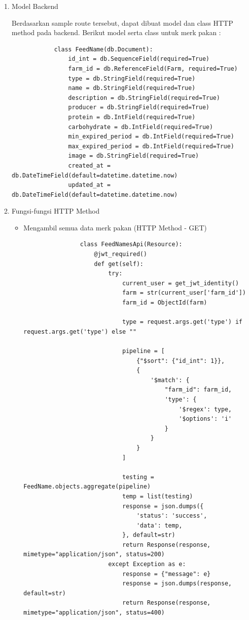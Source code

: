 \begin{spacing}{1.5}
\begin{enumerate}
\begin{enumerate}
		\end{enumerate}

		\item Model Backend
		
		Berdasarkan sample route tersebut, dapat dibuat model dan class HTTP method pada backend. Berikut model serta class untuk merk pakan :

		\begin{lstlisting}
			class FeedName(db.Document):
				id_int = db.SequenceField(required=True)
				farm_id = db.ReferenceField(Farm, required=True)
				type = db.StringField(required=True)
				name = db.StringField(required=True)
				description = db.StringField(required=True)
				producer = db.StringField(required=True)
				protein = db.IntField(required=True)
				carbohydrate = db.IntField(required=True)
				min_expired_period = db.IntField(required=True)
				max_expired_period = db.IntField(required=True)
				image = db.StringField(required=True)
				created_at = db.DateTimeField(default=datetime.datetime.now)
				updated_at = db.DateTimeField(default=datetime.datetime.now)
		\end{lstlisting}

		\item Fungsi-fungsi HTTP Method
		
			\begin{itemize}
				\item Mengambil semua data merk pakan (HTTP Method - GET)
					
			\begin{lstlisting}
				class FeedNamesApi(Resource):
					@jwt_required()
					def get(self):
						try:
							current_user = get_jwt_identity()
							farm = str(current_user['farm_id'])
							farm_id = ObjectId(farm)
				
							type = request.args.get('type') if request.args.get('type') else ""
				
							pipeline = [
								{"$sort": {"id_int": 1}},
								{
									'$match': {
										"farm_id": farm_id,
										'type': {
											'$regex': type,
											'$options': 'i'
										}
									}
								}
							]
				
							testing = FeedName.objects.aggregate(pipeline)
							temp = list(testing)
							response = json.dumps({
								'status': 'success',
								'data': temp,
							}, default=str)
							return Response(response, mimetype="application/json", status=200)
						except Exception as e:
							response = {"message": e}
							response = json.dumps(response, default=str)
							return Response(response, mimetype="application/json", status=400)
			\end{lstlisting}


\end{itemize}
\end{enumerate}
\end{spacing}
